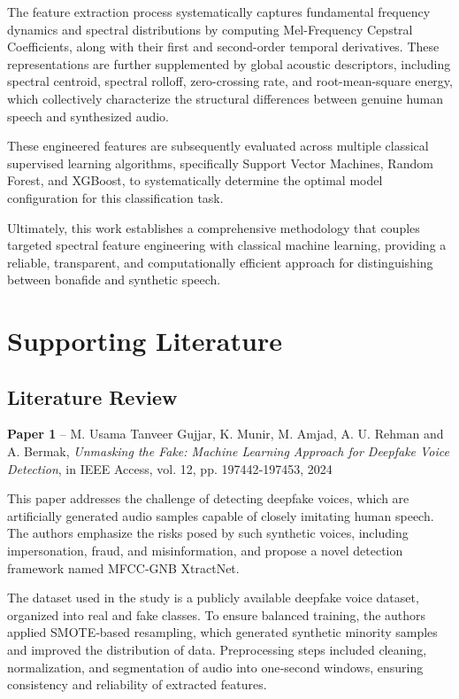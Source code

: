 \documentclass[12pt,a4paper]{report}
\begin{document}
The feature extraction process systematically captures fundamental frequency dynamics and spectral distributions by computing Mel-Frequency Cepstral Coefficients, along with their first and second-order temporal derivatives. These representations are further supplemented by global acoustic descriptors, including spectral centroid, spectral rolloff, zero-crossing rate, and root-mean-square energy, which collectively characterize the structural differences between genuine human speech and synthesized audio.

These engineered features are subsequently evaluated across multiple classical supervised learning algorithms, specifically Support Vector Machines, Random Forest, and XGBoost, to systematically determine the optimal model configuration for this classification task. 

Ultimately, this work establishes a comprehensive methodology that couples targeted spectral feature engineering with classical machine learning, providing a reliable, transparent, and computationally efficient approach for distinguishing between bonafide and synthetic speech.



\chapter{Supporting Literature}

\section{Literature Review }

\textbf{Paper 1} – M. Usama Tanveer Gujjar, K. Munir, M. Amjad, A. U. Rehman and A. Bermak, \textit{Unmasking the Fake: Machine Learning Approach for Deepfake Voice Detection}, in IEEE Access, vol. 12, pp. 197442‑197453, 2024

This paper addresses the challenge of detecting deepfake voices, which are artificially generated audio samples capable of closely imitating human speech. The authors emphasize the risks posed by such synthetic voices, including impersonation, fraud, and misinformation, and propose a novel detection framework named MFCC‑GNB XtractNet.  

The dataset used in the study is a publicly available deepfake voice dataset, organized into real and fake classes. To ensure balanced training, the authors applied SMOTE‑based resampling, which generated synthetic minority samples and improved the distribution of data. Preprocessing steps included cleaning, normalization, and segmentation of audio into one‑second windows, ensuring consistency and reliability of extracted features.  
\end{document}
